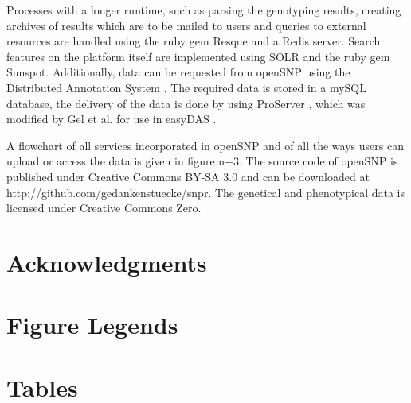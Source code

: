 \documentclass[10pt]{article}
\begin{document}
Processes with a longer runtime, such as parsing the genotyping results, creating archives of results which are to be mailed to users and queries to external resources are handled using the ruby gem Resque and a Redis server. Search features on the platform itself are implemented using SOLR and the ruby gem Sunspot. Additionally, data can be requested from openSNP using the Distributed Annotation System \cite{Dowell2001,Jenkinson2008}. The required data is stored in a mySQL database, the delivery of the data is done by using ProServer \cite{Finn2007}, which was modified by Gel et al. for use in easyDAS \cite{GelMoreno2011}.  

A flowchart of all services incorporated in openSNP and of all the ways users can upload or access the data is given in figure n+3. The source code of openSNP is published under Creative Commons BY-SA 3.0 and can be downloaded at http://github.com/gedankenstuecke/snpr. The genetical and phenotypical data is licensed under Creative Commons Zero. 
\section*{Acknowledgments}




\section*{Figure Legends}


\section*{Tables}
\end{document}
